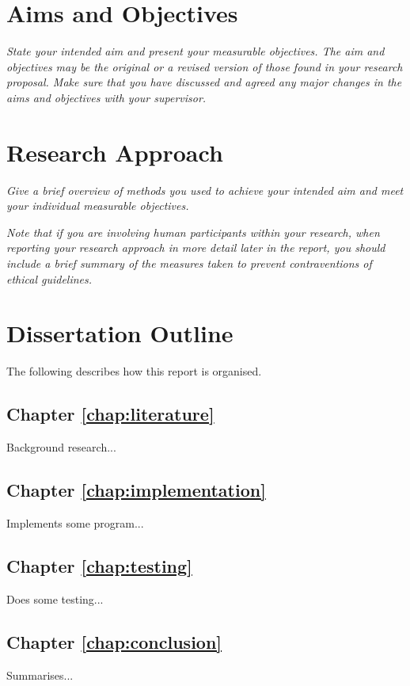 \documentclass[final,a4paper,11pt]{report}
\begin{document}
\section{Aims and Objectives}
\textit{State your intended aim and present your measurable objectives. The aim and objectives may be the original or a revised version of those found in your research proposal. Make sure that you have discussed and agreed any major changes in the aims and objectives with your supervisor.}

\section{Research Approach}
\textit{Give a brief overview of methods you used to achieve your intended aim and meet your individual measurable objectives.}

\textit{Note that if you are involving human participants within your research, when reporting your research approach in more detail later in the report, you should include a brief summary of the measures taken to prevent contraventions of ethical guidelines.}
 

\section{Dissertation Outline}
The following describes how this report is organised.

\subsection*{Chapter \ref{chap:literature} }
Background research...

\subsection*{Chapter \ref{chap:implementation} }
Implements some program...

\subsection*{Chapter \ref{chap:testing} }
Does some testing...

\subsection*{Chapter \ref{chap:conclusion} }
Summarises...
\end{document}
